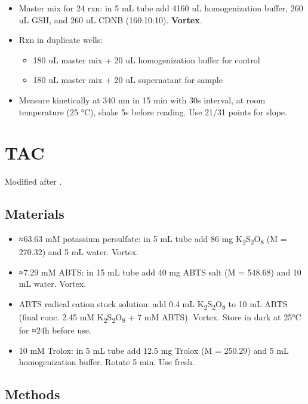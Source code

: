 \documentclass[
]{book}
\providecommand{\tightlist}{%
  \setlength{\itemsep}{0pt}\setlength{\parskip}{0pt}}
\begin{document}
\begin{itemize}
\tightlist
\item
  Master mix for 24 rxn: in 5 mL tube add 4160 uL homogenization buffer, 260 uL GSH, and 260 uL CDNB (160:10:10). \textbf{Vortex}.
\item
  Rxn in duplicate wells:

  \begin{itemize}
  \tightlist
  \item
    180 uL master mix + 20 uL homogenization buffer for control
  \item
    180 uL master mix + 20 uL supernatant for sample
  \end{itemize}
\item
  Measure kinetically at 340 nm in 15 min with 30s interval, at room temperature (25 °C), shake 5s before reading. Use 21/31 points for slope.
\end{itemize}

\hypertarget{tac}{%
\chapter{TAC}\label{tac}}

Modified after \textcite{re1999}.

\hypertarget{materials-9}{%
\section{Materials}\label{materials-9}}

\begin{itemize}
\tightlist
\item
  ≈63.63 mM potassium persulfate: in 5 mL tube add 86 mg K\textsubscript{2}S\textsubscript{2}O\textsubscript{8} (M = 270.32) and 5 mL water. Vortex.
\item
  ≈7.29 mM ABTS: in 15 mL tube add 40 mg ABTS salt (M = 548.68) and 10 mL water. Vortex.
\item
  ABTS radical cation stock solution: add 0.4 mL K\textsubscript{2}S\textsubscript{2}O\textsubscript{8} to 10 mL ABTS (final conc. 2.45 mM K\textsubscript{2}S\textsubscript{2}O\textsubscript{8} + 7 mM ABTS). Vortex. Store in dark at 25°C for ≈24h before use.
\item
  10 mM Trolox: in 5 mL tube add 12.5 mg Trolox (M = 250.29) and 5 mL homogenization buffer. Rotate 5 min. Use fresh.
\end{itemize}

\hypertarget{methods-9}{%
\section{Methods}\label{methods-9}}
\end{document}
